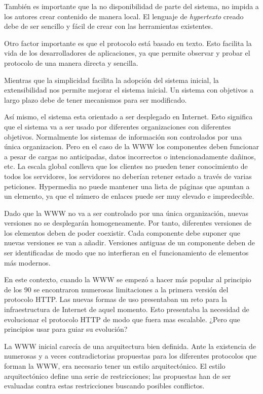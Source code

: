 También es importante que la no disponibilidad de parte del sistema,
no impida a los autores crear contenido de manera local. El lenguaje
de \emph{hypertexto} creado debe de ser sencillo y fácil de crear con
las herramientas existentes.

Otro factor importante es que el protocolo está basado en texto. Esto
facilita la vida de los desarrolladores de aplicaciones, ya que
permite observar y probar el protocolo de una manera directa y
sencilla.

Mientras que la simplicidad facilita la adopción del sistema inicial,
la extensibilidad nos permite mejorar el sistema inicial. Un sistema
con objetivos a largo plazo debe de tener mecanismos para ser
modificado.

Así mismo, el sistema esta orientado a ser desplegado en
Internet. Esto significa que el sistema va a ser usado por diferentes
organizaciones con diferentes objetivos. Normalmente los sistemas de
información son controlados por una única organizacion. Pero en el
caso de la WWW los componentes deben funcionar a pesar de cargas no
anticipadas, datos incorrectos o intencionadamente dañinos, etc. La
escala global conlleva que los clientes no pueden tener conocimiento
de todos los servidores, los servidores no deberían retener estado a
través de varias peticiones. Hypermedia no puede mantener una lista de
páginas que apuntan a un elemento, ya que el número de enlaces puede
ser muy elevado e impredecible.

Dado que la WWW no va a ser controlado por una única organización,
nuevas versiones no se desplegarán homogeneamente. Por tanto,
diferentes versiones de los elementos deben de poder coexistir. Cada
componente debe suponer que nuevas versiones se van a añadir.
Versiones antiguas de un componente deben de ser identificadas de modo
que no interfieran en el funcionamiento de elementos más modernos.

En este contexto, cuando la WWW se empezó a hacer más popular al
principio de los 90 se encontraron numerosas limitaciones a la primera
versión del protocolo HTTP. Las nuevas formas de uso presentaban un
reto para la infraestructura de Internet de aquel momento. Esto
presentaba la necesidad de evolucionar el protocolo HTTP de modo que
fuera mas escalable. ¿Pero que principios usar para guiar su evolución?

La WWW inicial carecía de una arquitectura bien definida. Ante la
existencia de numerosas y a veces contradictorias propuestas para los
diferentes protocolos que forman la WWW, era necesario tener un estilo
arquitectónico. El estilo arquitectónico define una serie de
restricciones; las propuestas han de ser evaluadas contra estas
restricciones buscando posibles conflictos.

